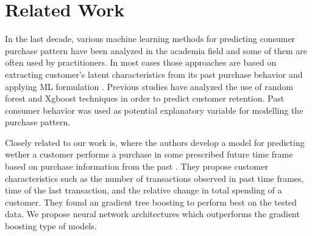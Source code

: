 \section{Related Work}
In the last decade, various machine learning methods for predicting consumer purchase pattern have been analyzed in
the academia field and some of them are often used by practitioners. In most cases those approaches are based on extracting 
customer’s latent characteristics from its past purchase behavior and applying ML formulation \cite{fader2009probability}. 
Previous studies have analyzed the use of random forest and Xgboost techniques in order to predict 
customer retention. Past consumer behavior was used as potential explanatory variable 
for modelling the purchase pattern. 

Closely related to our work is, where the authors develop a model for predicting wether a customer performs a 
purchase in some prescribed future time frame based on purchase information from the past \cite{martinez2020machine}. 
They propose customer characteristics such as the number of transactions observed in past time frames, 
time of the last transaction, and the relative change
in total spending of a customer. They found an gradient tree boosting to perform best on the
tested data. We propose neural network architectures which outperforms the gradient boosting type of models.
